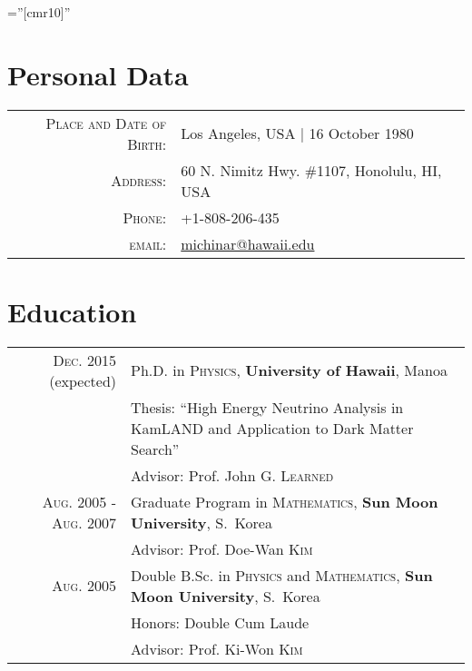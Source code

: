 \documentclass[a4paper,10pt]{article} %
\begin{document}
\pagestyle{empty} %

\font\fb=''[cmr10]'' %


\par{\bigskip\par} %

\section{Personal Data}

\begin{tabular}{rl}
\textsc{Place and Date of Birth:} & Los Angeles, USA  | 16 October 1980\\
\textsc{Address:} & 60 N. Nimitz Hwy. \#1107, Honolulu, HI, USA\\
\textsc{Phone:} & +1-808-206-435\\
\textsc{email:} & \href{mailto:michinar@hawaii.edu}{michinar@hawaii.edu}
\end{tabular}


\section{Education}

\begin{tabular}{rp{11cm}}	
	\textsc{Dec.} 2015 (expected) & Ph.D. in \textsc{Physics},
	\textbf{University of Hawaii}, Manoa\\
	& \small Thesis: ``High Energy Neutrino Analysis in KamLAND and Application
	to Dark Matter Search''\\
	& \small Advisor: Prof. John G. \textsc{Learned}\\


	\textsc{Aug.} 2005 - \textsc{Aug.} 2007 & Graduate Program in
	\textsc{Mathematics}, \normalsize\textbf{Sun Moon University}, S.~Korea\\
	& \small Advisor: Prof. Doe-Wan \textsc{Kim}\\


	\textsc{Aug.} 2005 & Double B.Sc. in \textsc{Physics} and
	\textsc{Mathematics}, \textbf{Sun Moon University}, S.~Korea\\
	& \small Honors: Double Cum Laude\\
	& \small Advisor: Prof. Ki-Won \textsc{Kim}\\


\end{tabular}
\end{document}
